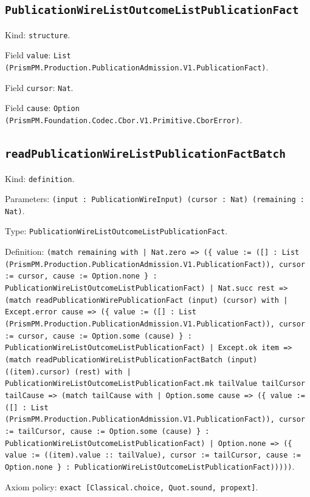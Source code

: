 \documentclass[11pt]{article}
\begin{document}
\subsection*{\texttt{PublicationWireListOutcomeListPublicationFact}}
\noindent Kind: \texttt{structure}.\par
\noindent Field \texttt{value}: \texttt{List (PrismPM.Production.PublicationAdmission.V1.PublicationFact)}.\par
\noindent Field \texttt{cursor}: \texttt{Nat}.\par
\noindent Field \texttt{cause}: \texttt{Option (PrismPM.Foundation.Codec.Cbor.V1.Primitive.CborError)}.\par
\subsection*{\texttt{readPublicationWireListPublicationFactBatch}}
\noindent Kind: \texttt{definition}.\par
\noindent Parameters: \texttt{(input : PublicationWireInput) (cursor : Nat) (remaining : Nat)}.\par
\noindent Type: \texttt{PublicationWireListOutcomeListPublicationFact}.\par
\noindent Definition: \texttt{(match remaining with | Nat.zero => (\{ value := ([] : List (PrismPM.Production.PublicationAdmission.V1.PublicationFact)), cursor := cursor, cause := Option.none \} : PublicationWireListOutcomeListPublicationFact) | Nat.succ rest => (match readPublicationWirePublicationFact (input) (cursor) with | Except.error cause => (\{ value := ([] : List (PrismPM.Production.PublicationAdmission.V1.PublicationFact)), cursor := cursor, cause := Option.some (cause) \} : PublicationWireListOutcomeListPublicationFact) | Except.ok item => (match readPublicationWireListPublicationFactBatch (input) ((item).cursor) (rest) with | PublicationWireListOutcomeListPublicationFact.mk tailValue tailCursor tailCause => (match tailCause with | Option.some cause => (\{ value := ([] : List (PrismPM.Production.PublicationAdmission.V1.PublicationFact)), cursor := tailCursor, cause := Option.some (cause) \} : PublicationWireListOutcomeListPublicationFact) | Option.none => (\{ value := ((item).value :: tailValue), cursor := tailCursor, cause := Option.none \} : PublicationWireListOutcomeListPublicationFact)))))}.\par
\noindent Axiom policy: \texttt{exact [Classical.choice, Quot.sound, propext]}.\par
\end{document}
